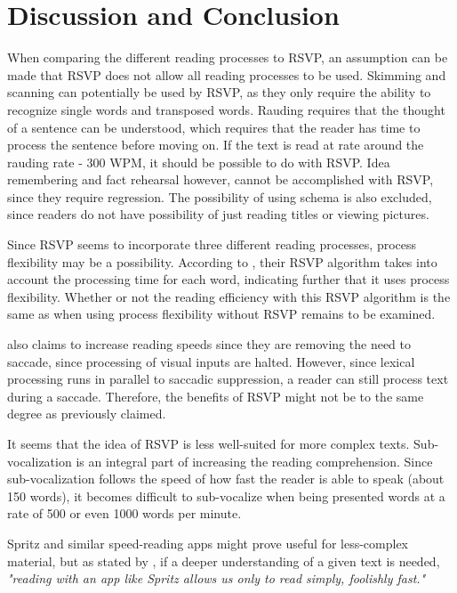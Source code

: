 \section{Discussion and Conclusion}
When comparing the different reading processes to RSVP, an assumption can be made that RSVP does not allow all reading processes to be used. Skimming and scanning can potentially be used by RSVP, as they only require the ability to recognize single words and transposed words. Rauding requires that the thought of a sentence can be understood, which requires that the reader has time to process the sentence before moving on. If the text is read at rate around the rauding rate - 300 WPM, it should be possible to do with RSVP.   Idea remembering and fact rehearsal however, cannot be accomplished with RSVP, since they require regression. The possibility of using schema is also excluded, since readers do not have possibility of just reading titles or viewing pictures.

Since RSVP seems to incorporate three different reading processes, process flexibility may be a possibility. According to \cite{spritz}, their RSVP algorithm takes into account the processing time for each word, indicating further that it uses process flexibility. Whether or not the reading efficiency with this RSVP algorithm is the same as when using process flexibility without RSVP remains to be examined.

 also claims to increase reading speeds since they are removing the need to saccade, since processing of visual inputs are halted. However, since lexical processing runs in parallel 
to saccadic suppression, a reader can still process text during a saccade. Therefore, the benefits of RSVP might not be to the same degree as previously claimed.

It seems that the idea of RSVP is less well-suited for more complex texts. Sub-vocalization is an integral part of increasing the reading comprehension. Since sub-vocalization follows the speed of how fast the reader is able to speak (about 150 words), it becomes difficult to sub-vocalize when being presented words at a rate of 500 or even 1000 words per minute. 

Spritz and similar speed-reading apps might prove useful for less-complex material, but as stated by , if a deeper understanding of a given text is needed, \emph{"reading with an app like Spritz allows us only to read simply, foolishly fast."}

